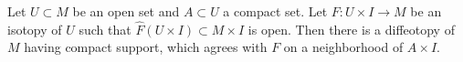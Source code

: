 Let $U \subset M$ be an open set and $A \subset U$ a compact set. Let $F: U \times I \rightarrow M$ be an isotopy of $U$ such that $\widehat{F}(U \times I) \subset M \times I$ is open. Then there is a diffeotopy of $M$ having compact support, which agrees with $F$ on a neighborhood of $A \times I$.
